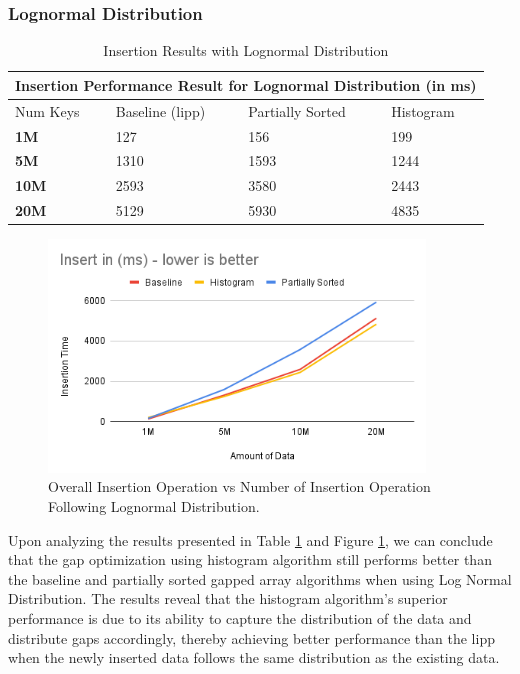\subsubsection{Lognormal Distribution}
\begin{table}
    \centering
    \begin{tabular}{ |p{2cm}|p{3cm}|p{3cm}|p{3cm}| } 
        
     \hline
     \multicolumn{4}{|c|}{Insertion Performance Result for Lognormal Distribution (in ms)} \\
     \hline
      Num Keys & Baseline (\acrshort{lipp})  & Partially Sorted & Histogram \\
     \hline
     \textbf{1M} & \cellcolor{green}127 & 156 & 199 \\
     \textbf{5M} & 1310 & 1593 & \cellcolor{green}1244 \\
     \textbf{10M} & 2593 & 3580 & \cellcolor{green}2443 \\
     \textbf{20M} & 5129 & 5930 & \cellcolor{green}4835 \\
     \hline
    
    \end{tabular}
     \caption{Insertion Results with Lognormal Distribution}
    \label{tab:InsertionResultLognormal}
\end{table}
\begin{figure}[H]
    \centering
    \includegraphics[width=100mm,scale=1]{Figures/InsertionResultLognormal.png}
    \caption{
     Overall Insertion Operation vs Number of Insertion Operation Following Lognormal Distribution.
    }
    \label{fig:GraphInsertionResultLognormal}
\end{figure}

Upon analyzing the results presented in Table \ref{tab:InsertionResultLognormal} and Figure \ref{fig:GraphInsertionResultLognormal}, we can conclude that the gap optimization using histogram algorithm still performs better than the baseline and partially sorted gapped array algorithms when using Log Normal Distribution. The results reveal that the histogram algorithm's superior performance is due to its ability to capture the distribution of the data and distribute gaps accordingly, thereby achieving better performance than the \acrshort{lipp} when the newly inserted data follows the same distribution as the existing data.

